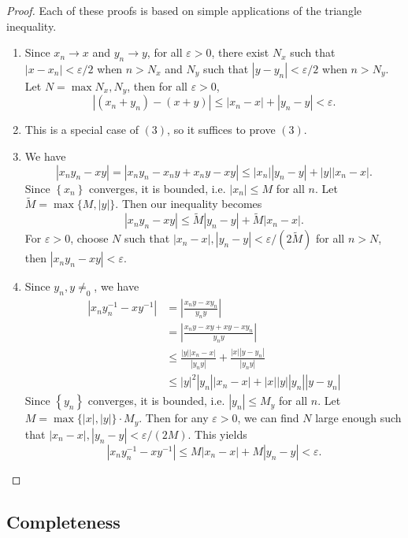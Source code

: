 \documentclass[10pt]{report}
\begin{document}
\begin{proof}
	Each of these proofs is based on simple applications of the triangle inequality.
	\begin{enumerate}
		\item Since $x_n \to x$ and $y_n \to y$, for all $\varepsilon>0$, there exist $N_x$ such that $|x-x_n| < \varepsilon/2$ when $n > N_x$ and $N_y$ such that $|y-y_n|<\varepsilon/2$ when $n>N_y$. Let $N = \max{N_x,N_y}$, then for all $\varepsilon>0$,
			\[
				|(x_n+y_n) - (x+y)| \leq |x_n - x| + |y_n - y| < \varepsilon.
			\] 

		\item This is a special case of $(3)$, so it suffices to prove $(3)$.

		\item We have
			\[
			|x_n y_n - xy| = |x_n y_n - x_n y + x_n y - xy| \leq |x_n| |y_n-y| + |y||x_n-x|.
			\] 
			Since $\left\{ x_n \right\}$ converges, it is bounded, i.e. $|x_n| \leq M$ for all $n$. Let $\tilde{M} = \max\{M, |y|\}$. Then our inequality becomes
			\[
			|x_n y_n - xy| \leq \tilde{M}|y_n-y| + \tilde{M} |x_n-x|.
			\] 
			For $\varepsilon>0$, choose $N$ such that $|x_n-x|, |y_n-y| < \varepsilon/(2\tilde{M})$ for all $n > N$, then $|x_n y_n - xy| < \varepsilon$.

		\item Since $y_n,y\neq_0$, we have
			\begin{align*}
				| x_n y_n^{-1}-xy^{-1}| &= \left| \frac{x_n y - x y_n}{y_n y} \right| \\
							&= \left| \frac{x_n y - xy + xy - x y_n}{y_n y} \right| \\
							&\leq \frac{|y| |x_n-x|}{|y_n y|} + \frac{|x| |y-y_n|}{|y_ny|} \\
							&\leq |y|^2 |y_n| |x_n-x| + |x||y||y_n||y-y_n|
			\end{align*}
			Since $\left\{ y_n \right\}$ converges, it is bounded, i.e. $|y_n| \leq M_y$ for all $n$. Let $M = \max\{|x|,|y|\} \cdot M_y$. Then for any $\varepsilon>0$, we can find $N$ large enough such that $|x_n-x|,|y_n-y| < \varepsilon/(2M)$. This yields
			\[
			| x_n y_n^{-1}-xy^{-1}| \leq M |x_n-x| + M |y_n-y| < \varepsilon.
			\] 
	\end{enumerate}
\end{proof}

\subsection{Completeness}
\end{document}
